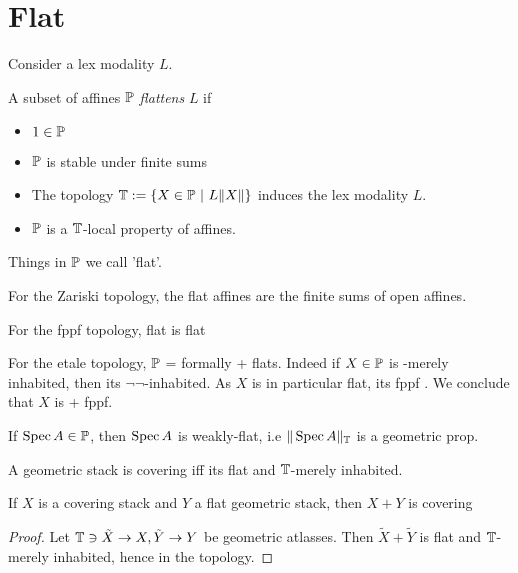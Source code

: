 \section{Flat}
Consider a lex modality $L$.
\begin{definition}
	A subset of affines $\mathbb{P}$ \emph{flattens} $L$ if
	\begin{itemize}
		\item $1 \in \mathbb{P}$
		\item $\mathbb{P}$ is stable under finite sums
		\item The topology $\bT := \{ X \in \bP \ | \ L \| X \| \}$ induces the lex modality $L$.
		\item $\mathbb{P}$ is a $\mathbb{T}$-local property of affines.

	\end{itemize}
	
\end{definition}

Things in $\mathbb{P}$ we call 'flat'.
\begin{example}
	For the Zariski topology, the flat affines are the finite sums of open affines.
\end{example}
\begin{example}
	For the fppf topology, flat is flat
\end{example}
\begin{example}
	For the etale topology, $\mathbb{P}$ = formally \etale + flats. Indeed if $X \in \mathbb{P}$ is \etale-merely inhabited, then its $\lnot\lnot$-inhabited. As $X$ is in particular flat, its fppf \todocite. We conclude that $X$ is \etale + fppf.
\end{example}
\begin{lemma}
	If $\operatorname{Spec} A \in \mathbb{P}$, then $\operatorname{Spec} A$ is weakly-flat, i.e $\| \operatorname{Spec} A\|_{\mathbb{T}}$ is a geometric prop.
\end{lemma}
\begin{lemma}{\label{lemma:detectCovering}}
	A geometric stack is covering iff its flat and $\mathbb{T}$-merely inhabited.
\end{lemma}

\begin{lemma}
	If $X$ is a covering stack and $Y$ a flat geometric stack, then $X + Y$ is covering
\end{lemma}
\begin{proof}
	Let $\mathbb{T} \ni \tilde X \to X, \tilde Y \to Y$ be geometric atlasses. Then $\tilde X+ \tilde Y$ is flat and $\mathbb{T}$-merely inhabited, hence in the topology.
\end{proof}



